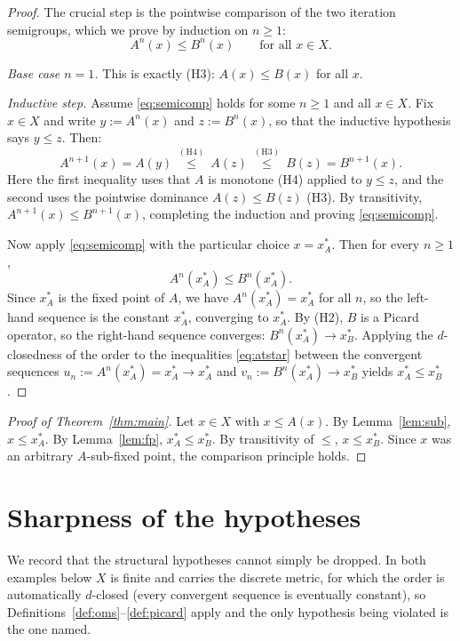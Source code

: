 \documentclass{amsart}
\theoremstyle{plain}
\theoremstyle{definition}
\newcommand{\xA}{x^{*}_{A}}
\newcommand{\xB}{x^{*}_{B}}
\begin{document}
\begin{proof}
The crucial step is the pointwise comparison of the two iteration semigroups,
which we prove by induction on $n\ge 1$:
\begin{equation}\label{eq:semicomp}
   A^{n}(x)\le B^{n}(x)\qquad\text{for all }x\in X .
\end{equation}

\emph{Base case $n=1$.} This is exactly (H3): $A(x)\le B(x)$ for all $x$.

\emph{Inductive step.} Assume \eqref{eq:semicomp} holds for some $n\ge 1$ and
all $x\in X$. Fix $x\in X$ and write $y:=A^{n}(x)$ and $z:=B^{n}(x)$, so that
the inductive hypothesis says $y\le z$. Then:
\[
   A^{n+1}(x)=A(y)\ \overset{(\mathrm{H4})}{\le}\ A(z)\ \overset{(\mathrm{H3})}{\le}\ B(z)=B^{n+1}(x).
\]
Here the first inequality uses that $A$ is monotone (H4) applied to $y\le z$,
and the second uses the pointwise dominance $A(z)\le B(z)$ (H3). By
transitivity, $A^{n+1}(x)\le B^{n+1}(x)$, completing the induction and proving
\eqref{eq:semicomp}.

Now apply \eqref{eq:semicomp} with the particular choice $x=\xA$. Then for
every $n\ge 1$,
\begin{equation}\label{eq:atstar}
   A^{n}(\xA)\le B^{n}(\xA).
\end{equation}
Since $\xA$ is the fixed point of $A$, we have $A^{n}(\xA)=\xA$ for all $n$, so
the left-hand sequence is the constant $\xA$, converging to $\xA$. By (H2),
$B$ is a Picard operator, so the right-hand sequence converges:
$B^{n}(\xA)\to\xB$. Applying the $d$-closedness of the order to the
inequalities \eqref{eq:atstar} between the convergent sequences
$u_n:=A^{n}(\xA)=\xA\to\xA$ and $v_n:=B^{n}(\xA)\to\xB$ yields
$\xA\le \xB$.
\end{proof}

\begin{proof}[Proof of Theorem~\ref{thm:main}]
Let $x\in X$ with $x\le A(x)$. By Lemma~\ref{lem:sub}, $x\le\xA$. By
Lemma~\ref{lem:fp}, $\xA\le\xB$. By transitivity of $\le$, $x\le\xB$. Since
$x$ was an arbitrary $A$-sub-fixed point, the comparison principle holds.
\end{proof}

\section{Sharpness of the hypotheses}\label{sec:sharp}

We record that the structural hypotheses cannot simply be dropped. In both
examples below $X$ is finite and carries the discrete metric, for which the
order is automatically $d$-closed (every convergent sequence is eventually
constant), so Definitions~\ref{def:oms}--\ref{def:picard} apply and the only
hypothesis being violated is the one named.
\end{document}
